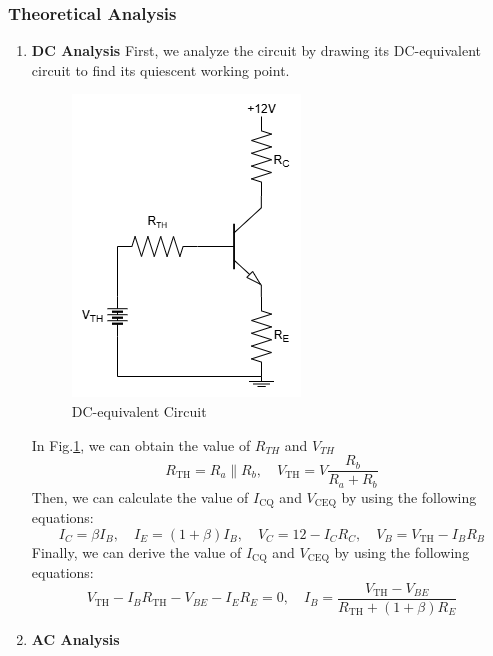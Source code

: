     \subsubsection{Theoretical Analysis}
        \begin{enumerate}[I]
            \item \textbf{DC Analysis}
                First, we analyze the circuit by drawing its DC-equivalent circuit to find its quiescent working point.\par
                \begin{figure}[H]
                    \centering
                    \includegraphics[width=0.3\linewidth]{Experiment_06/Circuit/Lab6dc.drawio.png}
                    \caption{DC-equivalent Circuit}
                    \label{cir:6dc}
                \end{figure}
                In Fig.\ref{cir:6dc}, we can obtain the value of $R_{TH}$ and $V_{TH}$
                \begin{equation}
                    R_{\text{TH}} = R_a \parallel R_b, \quad V_{\text{TH}} = V \frac{R_b}{R_a + R_b}
                \end{equation}
                Then, we can calculate the value of $I_{\text{CQ}}$ and $V_{\text{CEQ}}$ by using the following equations:
                \begin{equation}
                    I_C = \beta I_B, \quad I_E = (1 + \beta) I_B, \quad V_C = 12 - I_C R_C, \quad V_B = V_{\text{TH}} - I_B R_B
                \end{equation}
                Finally, we can derive the value of $I_{\text{CQ}}$ and $V_{\text{CEQ}}$ by using the following equations:
                \begin{equation}
                    V_{\text{TH}} - I_B R_{\text{TH}} - V_{BE} - I_E R_E = 0, \quad I_B = \frac{V_{\text{TH}} - V_{BE}}{R_{\text{TH}} + (1+\beta)R_E}
                \end{equation}
            \item \textbf{AC Analysis}

\end{enumerate}
